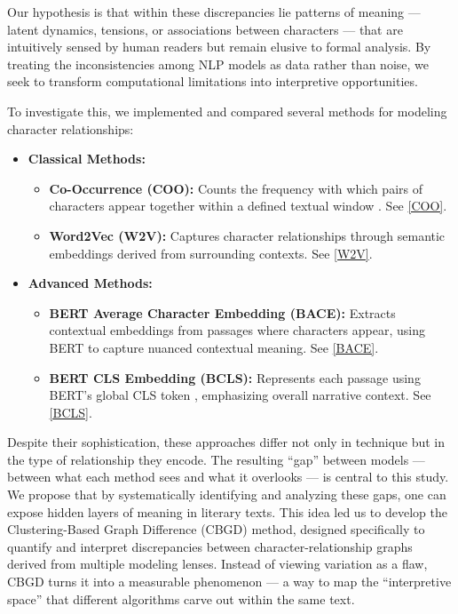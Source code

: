 \documentclass[a4paper,12pt]{report}
\begin{document}
Our hypothesis is that within these discrepancies lie patterns of meaning — latent dynamics, tensions, or associations between characters — that are intuitively sensed by human readers but remain elusive to formal analysis. By treating the inconsistencies among NLP models as data rather than noise, we seek to transform computational limitations into interpretive opportunities.

To investigate this, we implemented and compared several methods for modeling character relationships:

\begin{itemize}
\item \textbf{Classical Methods:}
\begin{itemize}
\item \textbf{Co-Occurrence (COO):} Counts the frequency with which pairs of characters appear together within a defined textual window \cite{LABATUT}. See \ref{COO}.
\item \textbf{Word2Vec (W2V):} Captures character relationships through semantic embeddings derived from surrounding contexts. \cite{WORD2VEC} See \ref{W2V}.
\end{itemize}
\item \textbf{Advanced Methods:}
\begin{itemize}
\item \textbf{BERT Average Character Embedding (BACE):} Extracts contextual embeddings from passages where characters appear, using BERT \cite{BERT} to capture nuanced contextual meaning. See \ref{BACE}.
\item \textbf{BERT CLS Embedding (BCLS):} Represents each passage using BERT’s global CLS token \cite{BERT}, emphasizing overall narrative context. See \ref{BCLS}.
\end{itemize}
\end{itemize}

Despite their sophistication, these approaches differ not only in technique but in the type of relationship they encode. The resulting “gap” between models — between what each method sees and what it overlooks — is central to this study.
We propose that by systematically identifying and analyzing these gaps, one can expose hidden layers of meaning in literary texts. This idea led us to develop the Clustering-Based Graph Difference (CBGD) method, designed specifically to quantify and interpret discrepancies between character-relationship graphs derived from multiple modeling lenses. Instead of viewing variation as a flaw, CBGD turns it into a measurable phenomenon — a way to map the “interpretive space” that different algorithms carve out within the same text.
\end{document}

